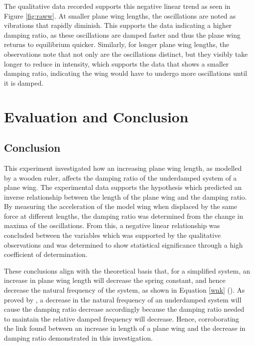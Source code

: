 \documentclass[12pt]{article}
\begin{document}
The qualitative data recorded supports this negative linear trend as seen in Figure \ref{fig:raww}. At smaller plane wing lengths, the oscillations are noted as vibrations that rapidly diminish. This supports the data indicating a higher damping ratio, as these oscillations are damped faster and thus the plane wing returns to equilibrium quicker. Similarly, for longer plane wing lengths, the observations note that not only are the oscillations distinct, but they visibly take longer to reduce in intensity, which supports the data that shows a smaller damping ratio, indicating the wing would have to undergo more oscillations until it is damped. 

\vspace{-5mm}

\section{Evaluation and Conclusion}

\subsection{Conclusion}
This experiment investigated how an increasing plane wing length, as modelled by a wooden ruler, affects the damping ratio of the underdamped system of a plane wing. The experimental data supports the hypothesis which predicted an inverse relationship between the length of the plane wing and the damping ratio. By measuring the acceleration of the model wing when displaced by the same force at different lengths, the damping ratio was determined from the change in maxima of the oscillations. From this, a negative linear relationship was concluded between the variables which was supported by the qualitative observations and was determined to show statistical significance through a high coefficient of determination. 

These conclusions align with the theoretical basis that, for a simplified system, an increase in plane wing length will decrease the spring constant, and hence decrease the natural frequency of the system, as shown in Equation \ref{wnk} (\citeauthor{hallauer_2022}). As proved by \citeauthor{miller_mattuck}, a decrease in the natural frequency of an underdamped system will cause the damping ratio decrease accordingly because the damping ratio needed to maintain the relative damped frequency will decrease. Hence, corroborating the link found between an increase in length of a plane wing and the decrease in damping ratio demonstrated in this investigation.
\end{document}
